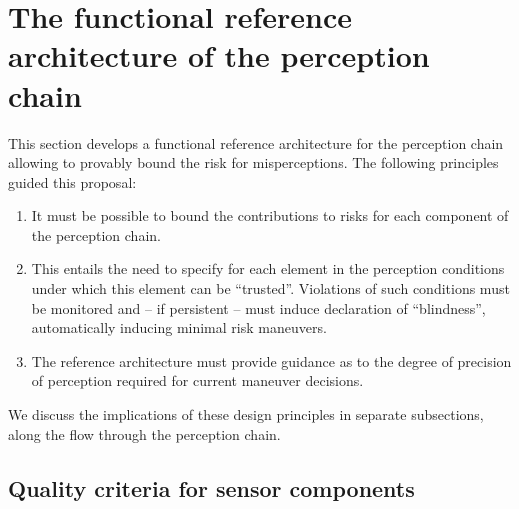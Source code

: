 \section{The functional reference architecture of the perception chain}\label{sec:refarchitecture}
This section develops a functional reference architecture for the perception chain allowing to provably bound the risk for misperceptions. The following principles guided this proposal:
\begin{enumerate}
\item It must be possible to bound the contributions to risks for each component of the perception chain.
\item This entails the need to specify for each element in the perception conditions under which this element can be \enquote{trusted}. Violations of such conditions must be monitored and -- if persistent -- must induce declaration of \enquote{blindness}, automatically inducing minimal risk maneuvers.
\item The reference architecture must provide guidance as to the degree of precision of perception required for current maneuver decisions.
\end{enumerate}
We discuss the implications of these design principles in separate subsections, along the flow through the perception chain.

\subsection{Quality criteria for sensor components}\label{subsec:quality}

